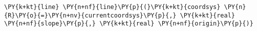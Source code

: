\begin{Verbatim}[commandchars=\\\{\}]
    \PY{k+kt}{line} \PY{n+nf}{line}\PY{p}{(}\PY{k+kt}{coordsys} \PY{n}{R}\PY{o}{=}\PY{n+nv}{currentcoordsys}\PY{p}{,} \PY{k+kt}{real} \PY{n+nf}{slope}\PY{p}{,} \PY{k+kt}{real} \PY{n+nf}{origin}\PY{p}{)}
\end{Verbatim}
